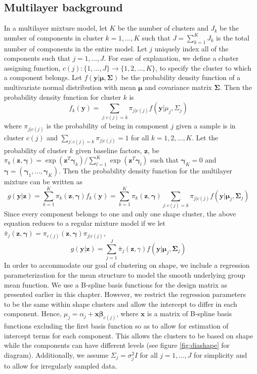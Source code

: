 \documentclass[12pt]{article}
\newcommand{\B}[0]{\mathbf}
\newcommand{\bs}[0]{\boldsymbol}
\begin{document}
\subsection{Multilayer background}
In a multilayer mixture model, let $K$ be the number of clusters and $J_{k}$ be the number of components in cluster $k=1,...,K$ such that $J=\sum_{k=1}^{K}J_{k}$ is the total number of components in the entire model. Let $j$ uniquely index all of the components such that $j=1,...,J$. For ease of explanation, we define a cluster assigning function, $c(j):\{1,...,J\}\rightarrow \{1,2,...,K\}$, to specify the cluster to which a component belongs. Let $f(\B y|\bs\mu,\bs\Sigma)$ be the probability density function of a multivariate normal distribution with mean $\bs\mu$ and covariance matrix $\bs\Sigma$. Then the probability density function for cluster $k$ is
$$f_{k}(\B y) = \sum_{j: c(j) = k} \pi_{j|c(j)}f(\B y|\mu_{j},\Sigma_{j})$$
where $\pi_{j|c(j)}$ is the probability of being in component $j$ given a sample is in cluster $c(j)$ and $\sum_{j: c(j) = k}\pi_{j|c(j)}=1$ for all $k=1,2,...,K$. Let the probability of cluster $k$ given baseline factors, $\B z$, be $\pi_{k}(\B z,\bs\gamma)=\exp(\B z^{T}\bs\gamma_{k})/\sum^{K}_{l=1}\exp(\B z^{T}\bs\gamma_{l})$ such that $\bs\gamma_{K}=0$ and $\bs\gamma=(\bs\gamma_{1},...,\bs\gamma_{K})$. Then the probability density function for the multilayer mixture can be written as
$$g(\B y|\B z) = \sum_{k=1}^{K}\pi_{k}(\B z,\bs \gamma)f_{k}(\B y) = \sum_{k=1}^{K}\pi_{k}(\B z,\bs\gamma)\sum_{j: c(j) = k} \pi_{j|c(j)}f( \B y| \bs\mu_{j},\bs\Sigma_{j})$$
Since every component belongs to one and only one shape cluster, the above equation reduces to a regular mixture model if we let $\bar{\pi}_{j}(\B z,\bs \gamma)=\pi_{c(j)}(\B z,\bs\gamma)\pi_{j|c(j)}$,
$$g(\B y|\B z) = \sum_{j=1}^{J}\bar{\pi}_{j}(\B z,\gamma)f(\B y|\bs \mu_{j},\bs\Sigma_{j})$$
In order to accommodate our goal of clustering on shape, we include a regression parameterization for the mean structure to model the smooth underlying group mean function. We use a B-spline basis functions for the design matrix as presented earlier in this chapter. However, we restrict the regression parameters to be the same within shape clusters and allow the intercept to differ in each component. Hence, $\mu_{j}=\alpha_{j}+\B x \bs\beta_{c(j)}$, where $\B x$ is a matrix of B-spline basis functions excluding the first basis function so as to allow for estimation of intercept terms for each component. This allows the clusters to be based on shape while the components can have different levels (see figure \ref{fig:diashape} for diagram). Additionally, we assume $\Sigma_{j}=\sigma^{2}_{j}I$ for all $j=1,...,J$  for simplicity and to allow for irregularly sampled data.\\
\end{document}
